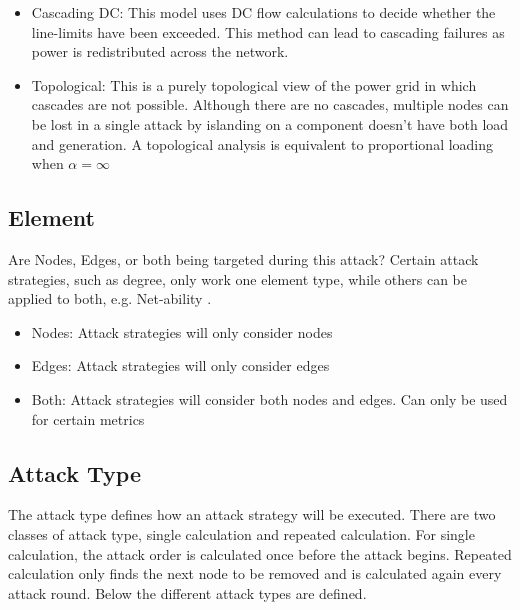 \begin{itemize}
    \item Cascading DC: This model uses DC flow calculations to decide whether the line-limits have been exceeded. This method can lead to cascading failures as power is redistributed across the network.
    \item Topological: This is a purely topological view of the power grid in which cascades are not possible. Although there are no cascades, multiple nodes can be lost in a single attack by islanding on a component doesn't have both load and generation. A topological analysis is equivalent to proportional loading when $\alpha = \infty$
\end{itemize}

\subsection{Element}
Are Nodes, Edges, or both being targeted during this attack? Certain attack strategies, such as degree, only work one element type, while others can be applied to both, e.g. Net-ability \cite{Arianos2008}.

\begin{itemize}
    \item Nodes: Attack strategies will only consider nodes
    \item Edges: Attack strategies will only consider edges
    \item Both: Attack strategies will consider both nodes and edges. Can only be used for certain metrics
\end{itemize}


\subsection{Attack Type}
\label{sect:attacktype}
The attack type defines how an attack strategy will be executed. There are two classes of attack type, single calculation and repeated calculation. For single calculation, the attack order is calculated once before the attack begins. Repeated calculation only finds the next node to be removed and is calculated again every attack round. Below the different attack types are defined.

